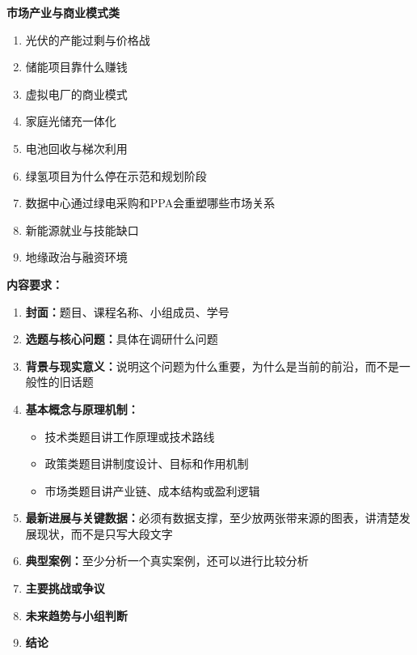 \documentclass[12pt,a4paper,UTF8]{ctexart}
\begin{document}
\vspace{0.3cm}
\noindent\textbf{\textcolor{purple!80!black}{市场产业与商业模式类}}
\begin{enumerate}
    \item 光伏的产能过剩与价格战
    \item 储能项目靠什么赚钱
    \item 虚拟电厂的商业模式
    \item 家庭光储充一体化
    \item 电池回收与梯次利用
    \item 绿氢项目为什么停在示范和规划阶段
    \item 数据中心通过绿电采购和PPA会重塑哪些市场关系
    \item 新能源就业与技能缺口
    \item 地缘政治与融资环境
\end{enumerate}

\vspace{0.5cm}
\noindent\textbf{内容要求：}
\begin{enumerate}
    \item \textbf{封面：}题目、课程名称、小组成员、学号
    \item \textbf{选题与核心问题：}具体在调研什么问题
    \item \textbf{背景与现实意义：}说明这个问题为什么重要，为什么是当前的前沿，而不是一般性的旧话题
    \item \textbf{基本概念与原理机制：}
          \begin{itemize}
              \item 技术类题目讲工作原理或技术路线
              \item 政策类题目讲制度设计、目标和作用机制
              \item 市场类题目讲产业链、成本结构或盈利逻辑
          \end{itemize}
    \item \textbf{最新进展与关键数据：}必须有数据支撑，至少放两张带来源的图表，讲清楚发展现状，而不是只写大段文字
    \item \textbf{典型案例：}至少分析一个真实案例，还可以进行比较分析
    \item \textbf{主要挑战或争议}
    \item \textbf{未来趋势与小组判断}
    \item \textbf{结论}
\end{enumerate}
\end{document}
